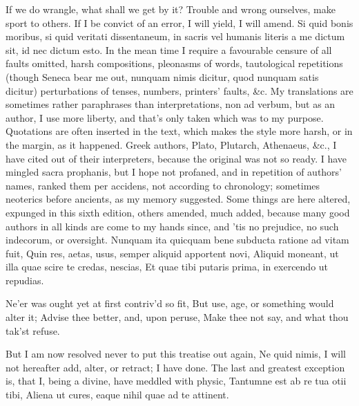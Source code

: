 {If we do wrangle, what shall we get by it? Trouble and wrong ourselves,
make sport to others. If I be convict of an error, I will yield, I will
amend. Si quid bonis moribus, si quid veritati dissentaneum, in sacris
vel humanis literis a me dictum sit, id nec dictum esto. In the mean
time I require a favourable censure of all faults omitted, harsh
compositions, pleonasms of words, tautological repetitions (though
Seneca bear me out, nunquam nimis dicitur, quod nunquam satis dicitur)
perturbations of tenses, numbers, printers' faults, \&c. My translations
are sometimes rather paraphrases than interpretations, non ad verbum,
but as an author, I use more liberty, and that's only taken which was
to my purpose. Quotations are often inserted in the text, which makes
the style more harsh, or in the margin, as it happened. Greek authors,
Plato, Plutarch, Athenaeus, \&c., I have cited out of their
interpreters, because the original was not so ready. I have mingled
sacra prophanis, but I hope not profaned, and in repetition of authors'
names, ranked them per accidens, not according to chronology; sometimes
neoterics before ancients, as my memory suggested. Some things are here
altered, expunged in this sixth edition, others amended, much added,
because many good authors in all kinds are come to my hands since,
and 'tis no prejudice, no such indecorum, or oversight.
Nunquam ita quicquam bene subducta ratione ad vitam fuit,
Quin res, aetas, usus, semper aliquid apportent novi,
Aliquid moneant, ut illa quae scire te credas, nescias,
Et quae tibi putaris prima, in exercendo ut repudias.

Ne'er was ought yet at first contriv'd so fit,
But use, age, or something would alter it;
Advise thee better, and, upon peruse,
Make thee not say, and what thou tak'st refuse.

But I am now resolved never to put this treatise out again, Ne quid
nimis, I will not hereafter add, alter, or retract; I have done. The
last and greatest exception is, that I, being a divine, have meddled
with physic,
Tantumne est ab re tua otii tibi,
Aliena ut cures, eaque nihil quae ad te attinent.

}
